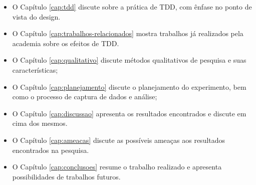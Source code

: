 \begin{itemize}
	\item O Capítulo \ref{cap:tdd} discute sobre a prática de TDD, com ênfase no
	ponto de vista do design.
  
	\item O Capítulo \ref{cap:trabalhos-relacionados} mostra trabalhos já
	realizados pela academia sobre os efeitos de TDD.

 	\item O Capítulo \ref{cap:qualitativo} discute métodos qualitativos de
 	pesquisa e suas características;

	\item O Capítulo \ref{cap:planejamento} discute o planejamento do experimento,
	bem como o processo de captura de dados e análise;

	\item O Capítulo \ref{cap:discussao} apresenta os resultados encontrados e
	discute em cima dos mesmos.
	
	\item O Capítulo \ref{cap:ameacas} discute as possíveis ameaças aos resultados
	encontrados na pesquisa.
	
	\item O Capítulo \ref{cap:conclusoes} resume o trabalho realizado e apresenta
	possibilidades de trabalhos futuros.
\end{itemize}

